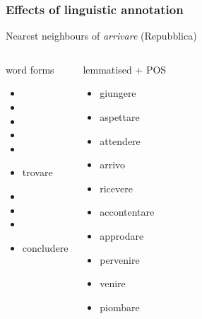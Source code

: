 \documentclass[t]{beamer} %
\begin{document}
\begin{frame}
  \frametitle{Effects of linguistic annotation}

  \centering
  Nearest neighbours of \emph{arrivare} (Repubblica)
  \ungap\footnotesize
  \begin{columns}[t]
    \column{4cm}
    \begin{block}{word forms}
      \begin{itemize}
      \item  {}
      \item  {}
      \item  {}
      \item  {}
      \item  {}
      \item  trovare
      \item  {}
      \item  {}
      \item  {}
      \item  concludere
      \end{itemize}
    \end{block}
    \column{4cm}
    \begin{block}{lemmatised + POS}
      \begin{itemize}
      \item giungere
      \item aspettare
      \item attendere
      \item arrivo 
      \item ricevere
      \item accontentare
      \item approdare
      \item pervenire
      \item venire
      \item piombare
      \end{itemize}
    \end{block}
  \end{columns}
  
  \hfill{}
\end{frame}
\end{document}
